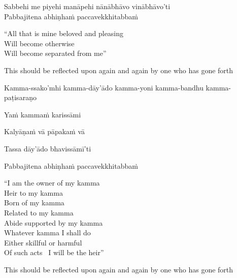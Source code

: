 Sabbehi me piyehi manāpehi nānābhāvo vinābhāvo'ti\\
Pabbajitena abhiṇhaṁ paccavekkhitabbaṁ

\begin{english-verses}
  ``All that is mine beloved and pleasing\\
  Will become otherwise\\
  Will become separated from me''
  \begin{english-hang-together-verses}
    This should be reflected upon again and again by one who has gone forth
  \end{english-hang-together-verses}
\end{english-verses}

\ifbfive\clearpage\fi

\begin{pali-hang}
  Kamma-ssako'mhi kamma-dāy'ādo kamma-yoni kamma-bandhu kamma-paṭisaraṇo
\end{pali-hang}
\begin{pali-hang-together}
  Yaṁ kammaṁ karissāmi
\end{pali-hang-together}
\begin{pali-hang-together}
  Kalyāṇaṁ vā pāpakaṁ vā
\end{pali-hang-together}
\begin{pali-hang-together}
  Tassa dāy'ādo bhavissāmī'ti
\end{pali-hang-together}
\begin{pali-hang-together}
  Pabbajitena abhiṇhaṁ paccavekkhitabbaṁ
\end{pali-hang-together}

\begin{english-verses}
  ``I am the owner of my kamma\\
  Heir to my kamma\\
  Born of my kamma\\
  Related to my kamma\\
  Abide supported by my kamma\\
  Whatever kamma I shall do\\
  Either skillful or harmful\\
  Of such acts \breathmark\ I will be the heir''\ifdigital\makeatletter\hyperlink{endnote102-appendix}\makeatother\fi
  \begin{english-hang-together-verses}
    This should be reflected upon again and again by one who has gone forth
  \end{english-hang-together-verses}
\end{english-verses}

